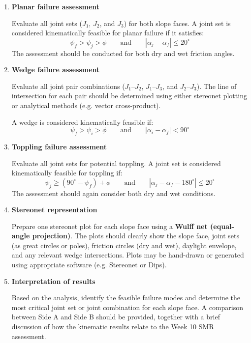 \documentclass[a4paper,12pt]{article}
\begin{document}
\begin{enumerate}
    \item \textbf{Planar failure assessment}

    Evaluate all joint sets ($J_1$, $J_2$, and $J_3$) for both slope faces. A joint set is considered kinematically feasible for planar failure if it satisfies:
    \[
    \psi_f > \psi_j > \phi
    \qquad \text{and} \qquad
    |\alpha_j - \alpha_f| \leq 20^\circ
    \]
    The assessment should be conducted for both dry and wet friction angles.

    \item \textbf{Wedge failure assessment}

    Evaluate all joint pair combinations ($J_1$--$J_2$, $J_1$--$J_3$, and $J_2$--$J_3$). The line of intersection for each pair should be determined using either stereonet plotting or analytical methods (e.g. vector cross-product).

    A wedge is considered kinematically feasible if:
    \[
    \psi_f > \psi_i > \phi
    \qquad \text{and} \qquad
    |\alpha_i - \alpha_f| < 90^\circ
    \]

    \item \textbf{Toppling failure assessment}

    Evaluate all joint sets for potential toppling. A joint set is considered kinematically feasible for toppling if:
    \[
    \psi_j \geq (90^\circ - \psi_f) + \phi
    \qquad \text{and} \qquad
    |\alpha_j - \alpha_f - 180^\circ| \leq 20^\circ
    \]
    The assessment should again consider both dry and wet conditions.

    \item \textbf{Stereonet representation}

    Prepare one stereonet plot for each slope face using a \textbf{Wulff net (equal-angle projection)}. The plots should clearly show the slope face, joint sets (as great circles or poles), friction circles (dry and wet), daylight envelope, and any relevant wedge intersections. Plots may be hand-drawn or generated using appropriate software (e.g. Stereonet or Dips).

    \item \textbf{Interpretation of results}

    Based on the analysis, identify the feasible failure modes and determine the most critical joint set or joint combination for each slope face. A comparison between Side A and Side B should be provided, together with a brief discussion of how the kinematic results relate to the Week 10 SMR assessment.
\end{enumerate}
\end{document}
